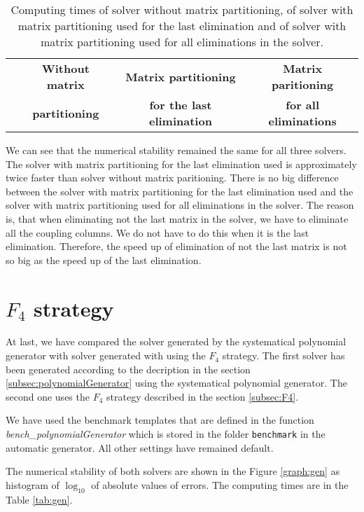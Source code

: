 \begin{table}[ht]
  \centering
  \begin{tabular}{|c||ccc|}
    \hline
      & \textbf{Without matrix} & \textbf{Matrix partitioning}      & \textbf{Matrix paritioning} \\
      & \textbf{partitioning}   & \textbf{for the last elimination} & \textbf{for all eliminations} \\
    \hline\hline
    
    \hline
  \end{tabular}
  \caption{Computing times of solver without matrix partitioning, of solver with matrix partitioning used for the last elimination and of solver with matrix partitioning used for all eliminations in the solver.}
  \label{tab:part}
\end{table}

We can see that the numerical stability remained the same for all three solvers. The solver with matrix partitioning for the last elimination used is approximately twice faster than solver without matrix paritioning. There is no big difference between the solver with matrix partitioning for the last elimination used and the solver with matrix partitioning used for all eliminations in the solver. The reason is, that when eliminating not the last matrix in the solver, we have to eliminate all the coupling columns. We do not have to do this when it is the last elimination. Therefore, the speed up of elimination of not the last matrix is not so big as the speed up of the last elimination.

\section{$F_4$ strategy}
At last, we have compared the solver generated by the systematical polynomial generator with solver generated with using the $F_4$ strategy. The first solver has been generated according to the decription in the section \ref{subsec:polynomialGenerator} using the systematical polynomial generator. The second one uses the $F_4$ strategy described in the section \ref{subsec:F4}.

We have used the benchmark templates that are defined in the function \textit{bench\_poly\-nomialGenerator} which is stored in the folder \texttt{benchmark} in the automatic generator. All other settings have remained default.

The numerical stability of both solvers are shown in the Figure \ref{graph:gen} as histogram of $\log_{10}$ of absolute values of errors. The computing times are in the Table \ref{tab:gen}.

